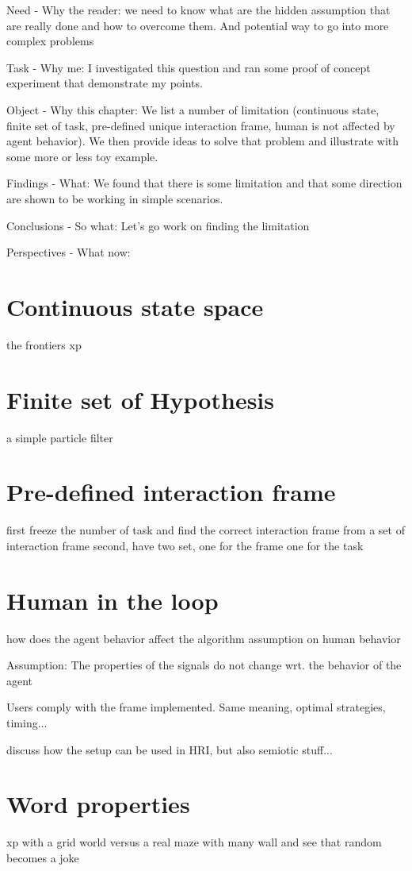 Need - Why the reader: we need to know what are the hidden assumption that are really done and how to overcome them. And potential way to go into more complex problems

Task - Why me: I investigated this question and ran some proof of concept experiment that demonstrate my points.

Object - Why this chapter: We list a number of limitation (continuous state, finite set of task, pre-defined unique interaction frame, human is not affected by agent behavior). We then provide ideas to solve that problem and illustrate with some more or less toy example.

Findings - What: We found that there is some limitation and that some direction are shown to be working in simple scenarios.

Conclusions - So what: Let's go work on finding the limitation

Perspectives - What now: 

\section{Continuous state space}
the frontiers xp

\section{Finite set of Hypothesis}
a simple particle filter

\section{Pre-defined interaction frame}
first freeze the number of task and find the correct interaction frame from a set of interaction frame
second, have two set, one for the frame one for the task

\section{Human in the loop}
how does the agent behavior affect the algorithm assumption on human behavior

Assumption: The properties of the signals do not change wrt. the behavior of the agent

Users comply with the frame implemented. Same meaning, optimal strategies, timing...

discuss how the setup can be used in HRI, but also semiotic stuff...

\section{Word properties}
xp with a grid world versus a real maze with many wall and see that random becomes a joke

